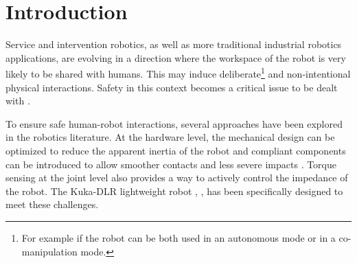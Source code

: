 \section{Introduction}
\label{sec:Problem statement}
Service and intervention robotics, as well as more traditional industrial robotics applications, are evolving in a direction where the workspace of the robot is very likely to be shared with humans. This may induce deliberate\footnote{For example if the robot can be both used in an autonomous mode or in a co-manipulation mode.} and non-intentional physical interactions. Safety in this context becomes a critical issue to be dealt with \cite{alami2006safe}.

To ensure safe human-robot interactions, several approaches have been explored in the robotics literature. At the hardware level, the mechanical design can be optimized to reduce the apparent inertia of the robot \cite{zinn2004} and compliant components can be introduced to allow smoother contacts and less severe impacts \cite{haddadin2012}. Torque sensing at the joint level also provides a way to actively control the impedance of the robot. The Kuka-DLR lightweight robot \cite{bischoff2010kuka}, \cite{loughlin2007dlr}, \cite{hirzinger2001} has been specifically designed to meet these challenges.

